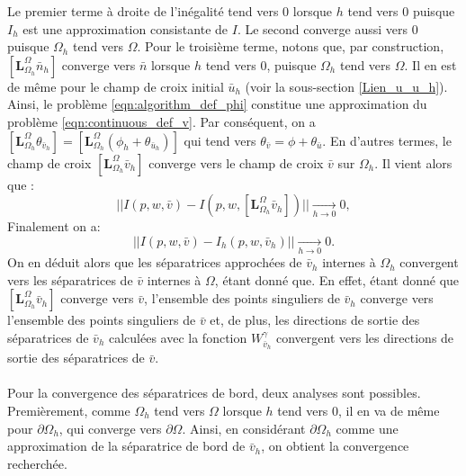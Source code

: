 Le premier terme à droite de l'inégalité tend vers $0$ lorsque $h$ tend vers $0$ puisque $I_h$ est une approximation consistante de $I$. Le second converge aussi vers $0$ puisque $\Omega_h$ tend vers $\Omega$. Pour le troisième terme, notons que, par construction, $[\mathbf{L}_{\Omega_h}^{\Omega}\bar{n}_h]$ converge vers $\bar{n}$ lorsque $h$ tend vers $0$, puisque $\Omega_h$ tend vers $\Omega$. Il en est de même pour le champ de croix initial $\bar{u}_h$ (voir la sous-section \ref{Lien_u_u_h}). Ainsi, le problème \eqref{eqn:algorithm_def_phi} constitue une approximation du problème \eqref{eqn:continuous_def_v}. Par conséquent, on a $[\mathbf{L}_{\Omega_h}^{\Omega}\theta_{\bar{v}_h}]=[\mathbf{L}_{\Omega_h}^{\Omega}(\phi_h+\theta_{\bar{u}_h})]$ qui tend vers $\theta_{\bar{v}}=\phi+\theta_{\bar{u}}$. En d'autres termes, le champ de croix $[\mathbf{L}_{\Omega_h}^{\Omega}\bar{v}_h]$ converge vers le champ de croix $\bar{v}$ sur $\Omega_h$. Il vient alors que :
$$||I(p,w,\bar{v})-I(p,w,[\mathbf{L}_{\Omega_h}^{\Omega}\bar{v}_h])||\xrightarrow[h \to 0]{} 0,$$
Finalement on a:
$$||I(p,w,\bar{v})-I_h(p,w,\bar{v}_h)||\xrightarrow[h \to 0]{} 0.$$
On en déduit alors que les séparatrices approchées de $\bar{v}_h$ internes à $\Omega_h$ convergent vers les séparatrices de $\bar{v}$ internes à $\Omega$, étant donné que. En effet, étant donné que $[\mathbf{L}_{\Omega_h}^{\Omega}\bar{v}_h]$ converge vers $\bar{v}$, l'ensemble des points singuliers de $\bar{v}_h$ converge vers l'ensemble des points singuliers de $\bar{v}$ et, de plus, les directions de sortie des séparatrices de $\bar{v}_h$ calculées avec la fonction $W^\gamma_{\bar{v}_h}$ convergent vers les directions de sortie des séparatrices de $\bar{v}$.\\\\
Pour la convergence des séparatrices de bord, deux analyses sont possibles. Premièrement, comme $\Omega_h$ tend vers $\Omega$ lorsque $h$ tend vers $0$, il en va de même pour $\partial\Omega_h$, qui converge vers $\partial\Omega$. Ainsi, en considérant $\partial\Omega_h$ comme une approximation de la séparatrice de bord de $\bar{v}_h$, on obtient la convergence recherchée.\\\\
